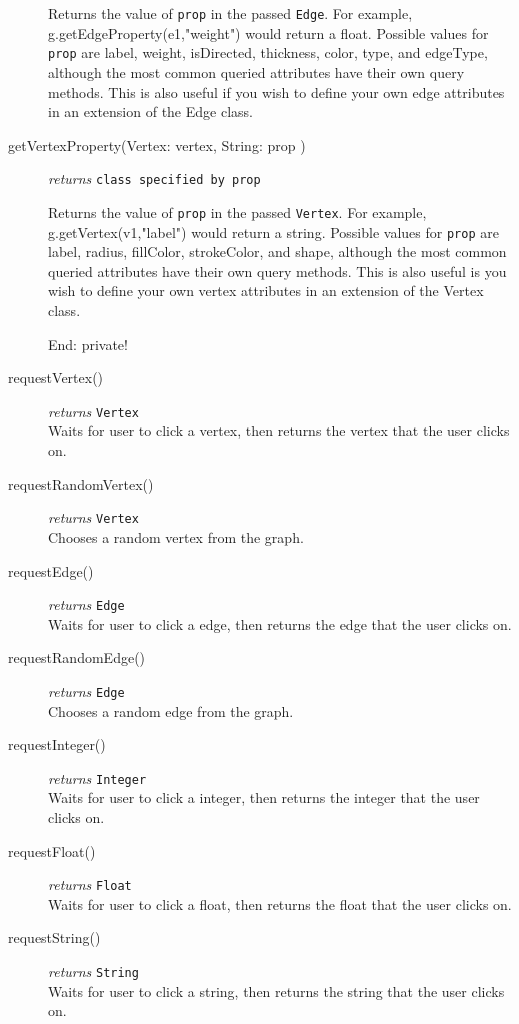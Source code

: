 \begin{description}
Returns the value of \texttt{prop} in the passed \texttt{Edge}. For example, g.getEdgeProperty(e1,"weight") would return a float. Possible values for \texttt{prop} are label, weight, isDirected, thickness, color, type, and edgeType, although the most common queried attributes have their own query methods. This is also useful if you wish to define your own edge attributes in an extension of the Edge class.

\item[getVertexProperty(Vertex: vertex, String: prop )]\emph{returns}
  \texttt{class specified by prop}

Returns the value of \texttt{prop} in the passed \texttt{Vertex}. For example, g.getVertex(v1,"label") would return a string. Possible values for \texttt{prop} are label, radius, fillColor, strokeColor, and shape, although the most common queried attributes have their own query methods. This is also useful is you wish to define your own vertex attributes in an extension of the Vertex class.

{\Large End: private!}

\item[requestVertex()]\emph{returns}
  \texttt{Vertex}\\
Waits for user to click a vertex, then returns the vertex that the user clicks on. 

\item[requestRandomVertex()]\emph{returns}
  \texttt{Vertex}\\
Chooses a random vertex from the graph.

\item[requestEdge()]\emph{returns}
  \texttt{Edge}\\
Waits for user to click a edge, then returns the edge that the user clicks on. 

\item[requestRandomEdge()]\emph{returns}
  \texttt{Edge}\\
Chooses a random edge from the graph.

\item[requestInteger()]\emph{returns}
  \texttt{Integer}\\
Waits for user to click a integer, then returns the integer that the user clicks on. 

\item[requestFloat()]\emph{returns}
  \texttt{Float}\\
Waits for user to click a float, then returns the float that the user clicks on. 

\item[requestString()]\emph{returns}
  \texttt{String}\\
Waits for user to click a string, then returns the string that the user clicks on. 

\end{description}

